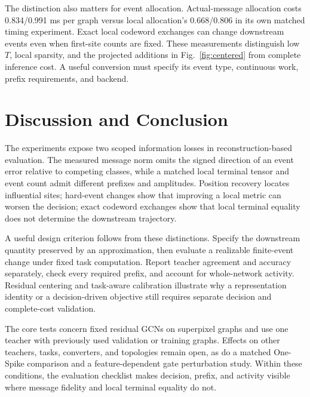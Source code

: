 \documentclass[10pt,twocolumn,letterpaper]{article}
\begin{document}
The distinction also matters for event allocation. Actual-message allocation costs 0.834/0.991 ms per graph versus local allocation's 0.668/0.806 in its own matched timing experiment. Exact local codeword exchanges can change downstream events even when first-site counts are fixed. These measurements distinguish low $T$, local sparsity, and the projected additions in Fig.~\ref{fig:centered} from complete inference cost. A useful conversion must specify its event type, continuous work, prefix requirements, and backend.

\section{Discussion and Conclusion}
The experiments expose two scoped information losses in reconstruction-based evaluation. The measured message norm omits the signed direction of an event error relative to competing classes, while a matched local terminal tensor and event count admit different prefixes and amplitudes. Position recovery locates influential sites; hard-event changes show that improving a local metric can worsen the decision; exact codeword exchanges show that local terminal equality does not determine the downstream trajectory.

A useful design criterion follows from these distinctions. Specify the downstream quantity preserved by an approximation, then evaluate a realizable finite-event change under fixed task computation. Report teacher agreement and accuracy separately, check every required prefix, and account for whole-network activity. Residual centering and task-aware calibration illustrate why a representation identity or a decision-driven objective still requires separate decision and complete-cost validation.

The core tests concern fixed residual GCNs on superpixel graphs and use one teacher with previously used validation or training graphs. Effects on other teachers, tasks, converters, and topologies remain open, as do a matched One-Spike comparison and a feature-dependent gate perturbation study. Within these conditions, the evaluation checklist makes decision, prefix, and activity visible where message fidelity and local terminal equality do not.

\clearpage
\end{document}
